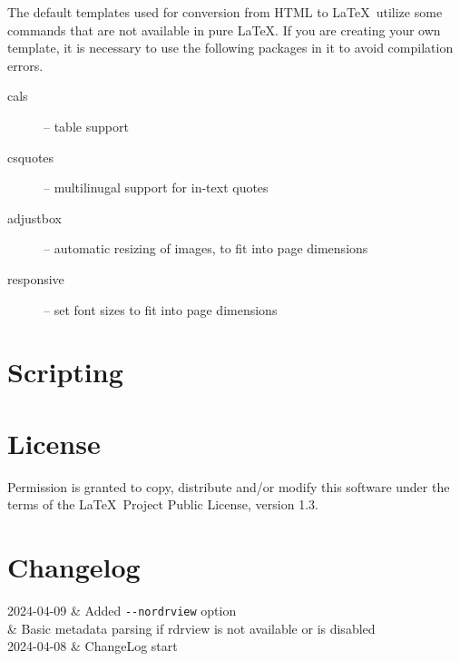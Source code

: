 \documentclass{article}
\makeatletter
\newenvironment{changelog}{\longtable{@{} l p{30em}}}{\endlongtable}
\newcommand\change[2]{#1 & #2\\}
\makeatother
\begin{document}
The default templates used for conversion from HTML to \LaTeX\ utilize some
commands that are not available in pure \LaTeX. If you are creating your own
template, it is necessary to use the following packages in it to avoid
compilation errors.

\begin{description}
  \item[cals] -- table support
  \item[csquotes] -- multilinugal support for in-text quotes
  \item[adjustbox] -- automatic resizing of images, to fit into page dimensions
  \item[responsive] -- set font sizes to fit into page dimensions
\end{description}

\section{Scripting}

\section{License}

Permission is granted to copy, distribute and/or modify this software
under the terms of the \LaTeX\ Project Public License, version 1.3.

\section{Changelog}
\begin{changelog}
  \change{2024-04-09}{Added \texttt{-\/-nordrview} option}
  \change{}{Basic metadata parsing if rdrview is not available or is disabled}
  \change{2024-04-08}{ChangeLog start}
\end{changelog}
\end{document}
